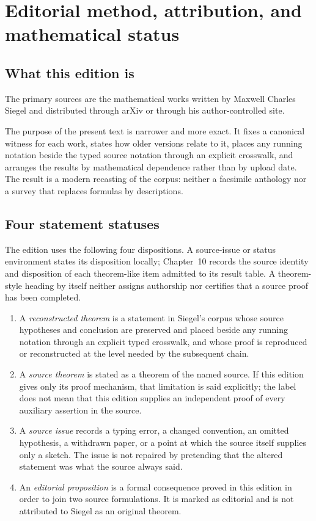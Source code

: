 \section{Editorial method, attribution, and mathematical status}

\subsection{What this edition is}

The primary sources are the mathematical works written by Maxwell Charles
Siegel and distributed through arXiv or through his author-controlled site.

The purpose of the present text is narrower and more exact.  It fixes a
canonical witness for each work, states how older versions relate to it,
places any running notation beside the typed source notation through an
explicit crosswalk, and arranges the results by mathematical dependence rather
than by upload date.  The result is a modern recasting of the corpus: neither
a facsimile anthology nor a survey that replaces formulas by descriptions.

\subsection{Four statement statuses}

The edition uses the following four dispositions.  A source-issue or status
environment states its disposition locally; Chapter~10 records the source
identity and disposition of each theorem-like item admitted to its result
table.  A theorem-style heading by itself neither assigns authorship nor
certifies that a source proof has been completed.

\begin{enumerate}[label=\textup{(\roman*)}]
\item A \emph{reconstructed theorem} is a statement in Siegel's corpus whose
      source hypotheses and conclusion are preserved and placed beside any
      running notation through an explicit typed crosswalk, and whose proof is
      reproduced or reconstructed at the level needed by the subsequent
      chain.
\item A \emph{source theorem} is stated as a theorem of the named source.  If
      this edition gives only its proof mechanism, that limitation is said
      explicitly; the label does not mean that this edition supplies an
      independent proof of every auxiliary assertion in the source.
\item A \emph{source issue} records a typing error, a changed convention, an
      omitted hypothesis, a withdrawn paper, or a point at which the source
      itself supplies only a sketch.  The issue is not repaired by pretending
      that the altered statement was what the source always said.
\item An \emph{editorial proposition} is a formal consequence proved in this
      edition in order to join two source formulations.  It is marked as
      editorial and is not attributed to Siegel as an original theorem.
\end{enumerate}

